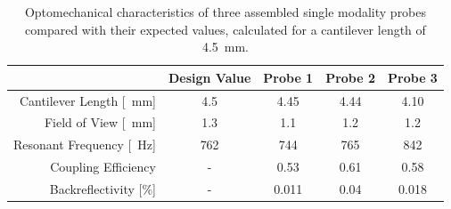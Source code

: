 \begin{table}[h!]\centering
\caption{Optomechanical characteristics of three assembled single modality probes compared with their expected values, calculated for a cantilever length of \SI{4.5}{\milli\meter}.}
\begin{tabular}{rcccc}
& 							\textbf{Design Value}&\textbf{Probe 1} & \textbf{Probe 2} & \textbf{Probe 3} \\ 
\hline
Cantilever Length [\SI{}{\milli\meter}] & 	4.5		& 	4.45 	& 	4.44	& 	4.10	\\
Field of View [\SI{}{\milli\meter}]		&	1.3		&	1.1	 	&	1.2 	& 	1.2  	\\ 
Resonant Frequency [\SI{}{\hertz}]  	&	762		& 	744		&	765 	& 	842 	\\ 
Coupling Efficiency  					&	-		& 	0.53	&	0.61 	&	0.58 	\\ 
Backreflectivity [\%] 					&	-		& 	0.011	&	0.04 	& 	0.018 	\\ 
\hline
\end{tabular} 
\label{tab:char}
\end{table}
